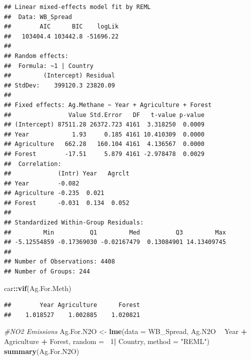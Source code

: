 \documentclass[12pt,]{article}
\newenvironment{Shaded}{\begin{snugshade}}{\end{snugshade}}
\newcommand{\KeywordTok}[1]{\textcolor[rgb]{0.13,0.29,0.53}{\textbf{#1}}}
\newcommand{\DataTypeTok}[1]{\textcolor[rgb]{0.13,0.29,0.53}{#1}}
\newcommand{\DecValTok}[1]{\textcolor[rgb]{0.00,0.00,0.81}{#1}}
\newcommand{\StringTok}[1]{\textcolor[rgb]{0.31,0.60,0.02}{#1}}
\newcommand{\CommentTok}[1]{\textcolor[rgb]{0.56,0.35,0.01}{\textit{#1}}}
\newcommand{\OperatorTok}[1]{\textcolor[rgb]{0.81,0.36,0.00}{\textbf{#1}}}
\newcommand{\NormalTok}[1]{#1}
\begin{document}
\begin{verbatim}
## Linear mixed-effects model fit by REML
##  Data: WB_Spread 
##        AIC      BIC    logLik
##   103404.4 103442.8 -51696.22
## 
## Random effects:
##  Formula: ~1 | Country
##         (Intercept) Residual
## StdDev:    399120.3 23820.09
## 
## Fixed effects: Ag.Methane ~ Year + Agriculture + Forest 
##                Value Std.Error   DF   t-value p-value
## (Intercept) 87511.28 26372.723 4161  3.318250  0.0009
## Year            1.93     0.185 4161 10.410309  0.0000
## Agriculture   662.28   160.104 4161  4.136567  0.0000
## Forest        -17.51     5.879 4161 -2.978478  0.0029
##  Correlation: 
##             (Intr) Year   Agrclt
## Year        -0.082              
## Agriculture -0.235  0.021       
## Forest      -0.031  0.134  0.052
## 
## Standardized Within-Group Residuals:
##         Min          Q1         Med          Q3         Max 
## -5.12554859 -0.17369030 -0.02167479  0.13084901 14.13409745 
## 
## Number of Observations: 4408
## Number of Groups: 244
\end{verbatim}

\begin{Shaded}
\begin{Highlighting}[]
\NormalTok{car}\OperatorTok{::}\KeywordTok{vif}\NormalTok{(Ag.For.Meth)}
\end{Highlighting}
\end{Shaded}

\begin{verbatim}
##        Year Agriculture      Forest 
##    1.018527    1.002885    1.020821
\end{verbatim}

\begin{Shaded}
\begin{Highlighting}[]
\CommentTok{#NO2 Emissions}
\NormalTok{Ag.For.N2O <-}\StringTok{ }\KeywordTok{lme}\NormalTok{(}\DataTypeTok{data =}\NormalTok{ WB_Spread,}
\NormalTok{                 Ag.N2O }\OperatorTok{~}\StringTok{ }\NormalTok{Year }\OperatorTok{+}\StringTok{ }\NormalTok{Agriculture }\OperatorTok{+}\StringTok{ }\NormalTok{Forest,}
                 \DataTypeTok{random =} \OperatorTok{~}\DecValTok{1}\OperatorTok{|}\StringTok{ }\NormalTok{Country,}
                 \DataTypeTok{method =} \StringTok{"REML"}\NormalTok{)}
\KeywordTok{summary}\NormalTok{(Ag.For.N2O)}
\end{Highlighting}
\end{Shaded}
\end{document}
